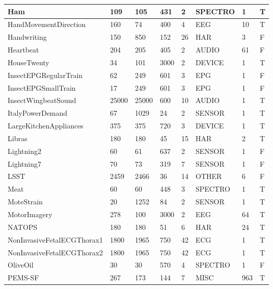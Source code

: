 \begin{landscape}
\begin{longtable}{|*{8}l|}
        \hline
        Ham & 109 & 105 & 431 & 2 & SPECTRO & 1 & T \\[1ex]
        \hline
        HandMovementDirection & 160 & 74 & 400 & 4 & EEG & 10 & T \\[1ex]
        \hline
        Handwriting & 150 & 850 & 152 & 26 & HAR & 3 & F \\[1ex]
        \hline
        Heartbeat & 204 & 205 & 405 & 2 & AUDIO & 61 & F \\[1ex]
        \hline
        HouseTwenty & 34 & 101 & 3000 & 2 & DEVICE & 1 & T \\[1ex]
        \hline
        InsectEPGRegularTrain & 62 & 249 & 601 & 3 & EPG & 1 & F \\[1ex]
        \hline
        InsectEPGSmallTrain & 17 & 249 & 601 & 3 & EPG & 1 & F \\[1ex]
        \hline
        InsectWingbeatSound & 25000 & 25000 & 600 & 10 & AUDIO & 1 & T \\[1ex]
        \hline
        ItalyPowerDemand & 67 & 1029 & 24 & 2 & SENSOR & 1 & T \\[1ex]
        \hline
        LargeKitchenAppliances & 375 & 375 & 720 & 3 & DEVICE & 1 & T \\[1ex]
        \hline
        Libras & 180 & 180 & 45 & 15 & HAR & 2 & T \\[1ex]
        \hline
        Lightning2 & 60 & 61 & 637 & 2 & SENSOR & 1 & F \\[1ex]
        \hline
        Lightning7 & 70 & 73 & 319 & 7 & SENSOR & 1 & F \\[1ex]
        \hline
        LSST & 2459 & 2466 & 36 & 14 & OTHER & 6 & F \\[1ex]
        \hline
        Meat & 60 & 60 & 448 & 3 & SPECTRO & 1 & T \\[1ex]
        \hline
        MoteStrain & 20 & 1252 & 84 & 2 & SENSOR & 1 & T \\[1ex]
        \hline
        MotorImagery & 278 & 100 & 3000 & 2 & EEG & 64 & T \\[1ex]
        \hline
        NATOPS & 180 & 180 & 51 & 6 & HAR & 24 & T \\[1ex]
        \hline
        NonInvasiveFetalECGThorax1 & 1800 & 1965 & 750 & 42 & ECG & 1 & T \\[1ex]
        \hline
        NonInvasiveFetalECGThorax2 & 1800 & 1965 & 750 & 42 & ECG & 1 & T \\[1ex]
        \hline
        OliveOil & 30 & 30 & 570 & 4 & SPECTRO & 1 & F \\[1ex]
        \hline
        PEMS-SF & 267 & 173 & 144 & 7 & MISC & 963 & T \\[1ex]

\end{longtable}
\end{landscape}
